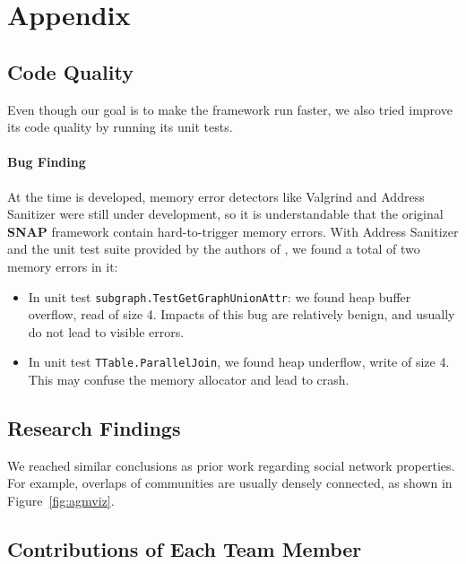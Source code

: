 
\section{Appendix}

\subsection{Code Quality}

Even though our goal is to make the \snap framework
run faster, we also tried improve its 
code quality by running its unit tests. 

\paragraph{Bug Finding} At the time
\snap is developed, memory error detectors like
Valgrind\citep{valgrind} and Address Sanitizer\citep{asan} 
were still under development, so it is understandable that
the original \textbf{SNAP} framework contain hard-to-trigger
memory errors. With Address Sanitizer\citep{asan} and the
unit test suite provided by the authors of \snap, we 
found a total of two memory errors in it:

\begin{itemize}
    \item In unit test \texttt{subgraph.TestGetGraphUnionAttr}:
    we found heap buffer overflow, read of size 4. Impacts
    of this bug are relatively benign, and usually do not
    lead to visible errors.

    \item In unit test \texttt{TTable.ParallelJoin}, we found
    heap underflow, write of size 4. This may confuse 
    the memory allocator and lead to crash.
\end{itemize}

\subsection{Research Findings}

We reached similar conclusions as prior work regarding social network
properties. For example, overlaps of communities are usually densely
connected\citep{yang2012structure}, as shown in Figure~\ref{fig:agmviz}.


\subsection{Contributions of Each Team Member}

